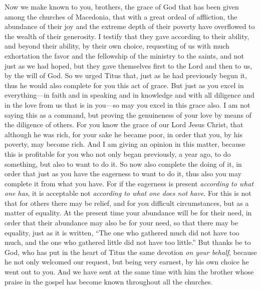 \begin{biblechapter} %
 Now we make known to you, brothers, the grace of God that has been given among the churches of Macedonia,
\verse that with a great ordeal of affliction, the abundance of their joy and the extreme depth of their poverty have overflowed to the wealth of their generosity.
\verse I testify that they gave according to their ability, and beyond their ability, by their own choice,
\verse requesting of us with much exhortation the favor and the fellowship of the ministry to the saints,
\verse and not just as we had hoped, but they gave themselves first to the Lord and then to us, by the will of God.
\verse So we urged Titus that, just as he had previously begun it, thus he would also complete for you this act of grace.
\verse But just as you excel in everything—in faith and in speaking and in knowledge and with all diligence and in the love from us that is in you—so may you excel in this grace also.
\verse I am not saying this as a command, but proving the genuineness of your love by means of the diligence of others.
\verse For you know the grace of our Lord Jesus Christ, that although he was rich, for your sake he became poor, in order that you, by his poverty, may become rich.
\verse And I am giving an opinion in this matter, because this is profitable for you who not only began previously, a year ago, to do something, but also to want to do it.
\verse So now also complete the doing of it, in order that just as you have the eagerness to want to do it, thus also you may complete it from what you have.
\verse For if the eagerness is present \textit{according to what one has}, it is acceptable not \textit{according to what one does not have}.
\verse For this is not that for others there may be relief, and for you difficult circumstances, but as a matter of equality.
\verse At the present time your abundance will be for their need, in order that their abundance may also be for your need, so that there may be equality,
\verse just as it is written, “The one who gathered much did not have too much, and the one who gathered little did not have too little.”
 But thanks be to God, who has put in the heart of Titus the same devotion \textit{on your behalf},
\verse because he not only welcomed our request, but being very earnest, by his own choice he went out to you.
\verse And we have sent at the same time with him the brother whose praise in the gospel has become known throughout all the churches.

\end{biblechapter}
